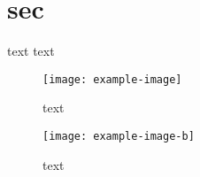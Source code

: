 \documentclass[ignorenonframetext]{beamer}
\begin{document}
\section{sec}

text text

\begin{frame}
    \begin{figure}
    \texttt{[image: example-image]}
    \caption{text}
    \end{figure}
\end{frame}


\begin{frame}
\begin{figure}
\texttt{[image: example-image-b]}
\caption{text}
\end{figure}
\end{frame}
\end{document}
